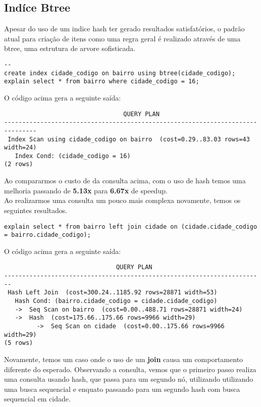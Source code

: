 \documentclass[12pt, a4paper, twoside, titlepage]{article}
\begin{document}
\subsection{Indíce Btree}
Apesar do uso de um indice hash ter gerado resultados satisfatórios, o padrão atual para criação de itens como uma regra geral é realizado através de uma btree, uma estrutura de arvore sofisticada.
\begin{lstlisting}
--
create index cidade_codigo on bairro using btree(cidade_codigo);
explain select * from bairro where cidade_codigo = 16;
\end{lstlisting}
O código acima gera a seguinte saída: 
\begin{lstlisting}
                                 QUERY PLAN
-------------------------------------------------------------------------------
 Index Scan using cidade_codigo on bairro  (cost=0.29..83.03 rows=43 width=24)
   Index Cond: (cidade_codigo = 16)
(2 rows)
\end{lstlisting}
Ao compararmos o custo de da consulta acima, com o uso de hash temos uma melhoria passando de \textbf{5.13x} para \textbf{6.67x} de speedup.
\\Ao realizarmos uma consulta um pouco mais complexa novamente, temos os seguintes resultados. 
\begin{lstlisting}
explain select * from bairro left join cidade on (cidade.cidade_codigo = bairro.cidade_codigo);
\end{lstlisting}
O código acima gera a seguinte saída: 
\begin{lstlisting}
                               QUERY PLAN
------------------------------------------------------------------------
 Hash Left Join  (cost=300.24..1185.92 rows=28871 width=53)
   Hash Cond: (bairro.cidade_codigo = cidade.cidade_codigo)
   ->  Seq Scan on bairro  (cost=0.00..488.71 rows=28871 width=24)
   ->  Hash  (cost=175.66..175.66 rows=9966 width=29)
         ->  Seq Scan on cidade  (cost=0.00..175.66 rows=9966 width=29)
(5 rows)

\end{lstlisting}
Novamente, temos um caso onde o uso de um \textbf{join} causa um comportamento diferente do esperado. Observando a consulta, vemos que o primeiro passo realiza uma consulta usando hash, que passa para um segundo nó, utilizando utilizando uma busca sequencial e enquato passando para um segundo hash com busca sequencial em cidade.
\end{document}
